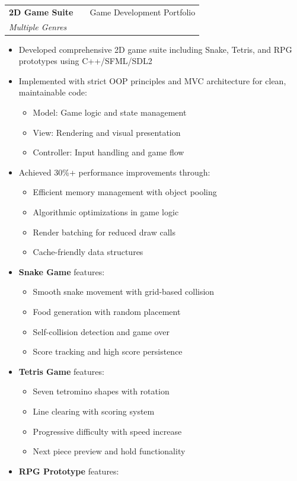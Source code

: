 \documentclass[a4paper,12pt]{article}
\makeatletter
\newenvironment{projectdetailed}[3]
    {
    \begin{tabularx}{\linewidth}{@{}l X r@{}}
    \textbf{#1} & \hfill & #2 \\
    \textit{#3} & & \\[3.75pt]
    \end{tabularx}
    \begin{minipage}[t]{\linewidth}
    \begin{itemize}[nosep,after=\strut, leftmargin=1em, itemsep=2pt,label=--]
    }
    {
    \end{itemize}
    \end{minipage}
    \vspace{6pt}
    }
\makeatother
\begin{document}
\begin{projectdetailed}{2D Game Suite}{Game Development Portfolio}{Multiple Genres}
\item Developed comprehensive 2D game suite including Snake, Tetris, and RPG prototypes using C++/SFML/SDL2
\item Implemented with strict OOP principles and MVC architecture for clean, maintainable code:
\begin{itemize}[nosep, leftmargin=2em]
    \item Model: Game logic and state management
    \item View: Rendering and visual presentation
    \item Controller: Input handling and game flow
\end{itemize}
\item Achieved 30\%+ performance improvements through:
\begin{itemize}[nosep, leftmargin=2em]
    \item Efficient memory management with object pooling
    \item Algorithmic optimizations in game logic
    \item Render batching for reduced draw calls
    \item Cache-friendly data structures
\end{itemize}
\item \textbf{Snake Game} features:
\begin{itemize}[nosep, leftmargin=2em]
    \item Smooth snake movement with grid-based collision
    \item Food generation with random placement
    \item Self-collision detection and game over
    \item Score tracking and high score persistence
\end{itemize}
\item \textbf{Tetris Game} features:
\begin{itemize}[nosep, leftmargin=2em]
    \item Seven tetromino shapes with rotation
    \item Line clearing with scoring system
    \item Progressive difficulty with speed increase
    \item Next piece preview and hold functionality
\end{itemize}
\item \textbf{RPG Prototype} features:

\end{projectdetailed}
\end{document}
